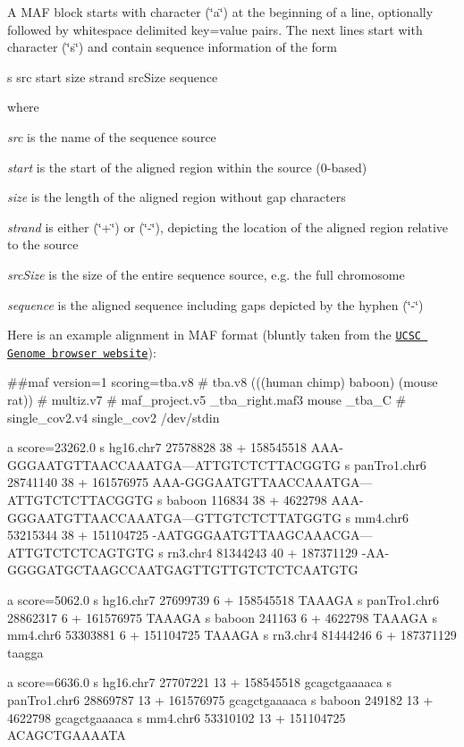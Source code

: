 A M\+AF block starts with character (\char`\"{}a\char`\"{}) at the beginning of a line, optionally followed by whitespace delimited key=value pairs. The next lines start with character (\char`\"{}s\char`\"{}) and contain sequence information of the form \begin{DoxyVerb}s src start size strand srcSize sequence
\end{DoxyVerb}
 where
\begin{DoxyItemize}
\item {\itshape src} is the name of the sequence source
\item {\itshape start} is the start of the aligned region within the source (0-\/based)
\item {\itshape size} is the length of the aligned region without gap characters
\item {\itshape strand} is either (\char`\"{}+\char`\"{}) or (\char`\"{}-\/\char`\"{}), depicting the location of the aligned region relative to the source
\item {\itshape src\+Size} is the size of the entire sequence source, e.\+g. the full chromosome
\item {\itshape sequence} is the aligned sequence including gaps depicted by the hyphen (\char`\"{}-\/\char`\"{})
\end{DoxyItemize}Here is an example alignment in M\+AF format (bluntly taken from the \href{https://cgwb.nci.nih.gov/FAQ/FAQformat.html#format5}{\tt U\+C\+SC Genome browser website})\+: \begin{DoxyVerb}##maf version=1 scoring=tba.v8 
# tba.v8 (((human chimp) baboon) (mouse rat)) 
# multiz.v7
# maf_project.v5 _tba_right.maf3 mouse _tba_C
# single_cov2.v4 single_cov2 /dev/stdin
                   
a score=23262.0     
s hg16.chr7    27578828 38 + 158545518 AAA-GGGAATGTTAACCAAATGA---ATTGTCTCTTACGGTG
s panTro1.chr6 28741140 38 + 161576975 AAA-GGGAATGTTAACCAAATGA---ATTGTCTCTTACGGTG
s baboon         116834 38 +   4622798 AAA-GGGAATGTTAACCAAATGA---GTTGTCTCTTATGGTG
s mm4.chr6     53215344 38 + 151104725 -AATGGGAATGTTAAGCAAACGA---ATTGTCTCTCAGTGTG
s rn3.chr4     81344243 40 + 187371129 -AA-GGGGATGCTAAGCCAATGAGTTGTTGTCTCTCAATGTG
                   
a score=5062.0                    
s hg16.chr7    27699739 6 + 158545518 TAAAGA
s panTro1.chr6 28862317 6 + 161576975 TAAAGA
s baboon         241163 6 +   4622798 TAAAGA 
s mm4.chr6     53303881 6 + 151104725 TAAAGA
s rn3.chr4     81444246 6 + 187371129 taagga

a score=6636.0
s hg16.chr7    27707221 13 + 158545518 gcagctgaaaaca
s panTro1.chr6 28869787 13 + 161576975 gcagctgaaaaca
s baboon         249182 13 +   4622798 gcagctgaaaaca
s mm4.chr6     53310102 13 + 151104725 ACAGCTGAAAATA\end{DoxyVerb}

